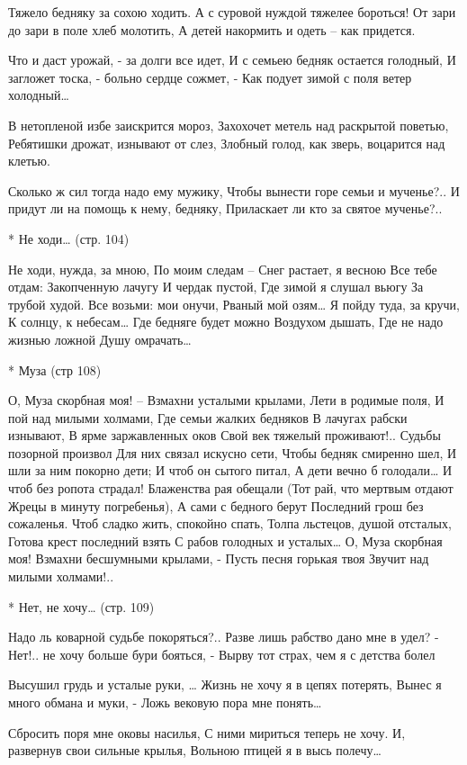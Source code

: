 Тяжело бедняку за сохою ходить.
А с суровой нуждой тяжелее бороться!
От зари до зари в поле хлеб молотить,
А детей накормить и одеть – как придется.

Что и даст урожай, - за долги все идет,
И с семьею бедняк остается голодный,
И загложет тоска, - больно сердце сожмет, -
Как подует зимой с поля ветер холодный…

В нетопленой избе заискрится мороз,
Захохочет метель над раскрытой поветью,
Ребятишки дрожат, изнывают от слез,
Злобный голод, как зверь, воцарится над клетью.

Сколько ж сил тогда надо ему мужику,
Чтобы вынести горе семьи и мученье?..
И придут ли на помощь к нему, бедняку,
Приласкает ли кто за святое мученье?..


* Не ходи… (стр. 104)

Не ходи, нужда, за мною,
По моим следам –
Снег растает, я весною
Все тебе отдам:
Закопченную лачугу
И чердак пустой,
Где зимой я слушал вьюгу
За трубой худой.
Все возьми: мои онучи,
Рваный мой озям…
Я пойду туда, за кручи,
К солнцу, к небесам…
Где бедняге будет можно
Воздухом дышать,
Где не надо жизнью ложной
Душу омрачать…


* Муза (стр 108)

О, Муза скорбная моя! –
Взмахни усталыми крылами,
Лети в родимые поля,
И пой над милыми холмами,
Где семьи жалких бедняков
В лачугах рабски изнывают,
В ярме заржавленных оков
Свой век тяжелый проживают!..
Судьбы позорной произвол
Для них связал искусно сети,
Чтобы бедняк смиренно шел,
И шли за ним покорно дети;
И чтоб он сытого питал,
А дети вечно б голодали…
И чтоб без ропота страдал!
Блаженства рая обещали
(Тот рай, что мертвым отдают
Жрецы в минуту погребенья),
А сами с бедного берут
Последний грош без сожаленья.
Чтоб сладко жить, спокойно спать,
Толпа льстецов, душой отсталых,
Готова крест последний взять
С рабов голодных и усталых…
О, Муза скорбная моя!
Взмахни бесшумными крылами, -
Пусть песня горькая твоя
Звучит над милыми холмами!..


* Нет, не хочу… (стр. 109)

Надо ль коварной судьбе покоряться?..
Разве лишь рабство дано мне в удел?
- Нет!.. не хочу больше бури бояться, -
Вырву тот страх, чем я с детства болел

Высушил грудь и усталые руки, …
Жизнь не хочу я в цепях потерять,
Вынес я много обмана и муки, -
Ложь вековую пора мне понять…

Сбросить поря мне оковы насилья,
С ними мириться теперь не хочу.
И, развернув свои сильные крылья,
Вольною птицей я в высь полечу…


